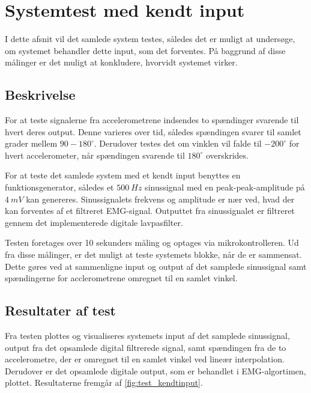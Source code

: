 \section{Systemtest med kendt input}
I dette afsnit vil det samlede system testes, således det er muligt at undersøge, om systemet behandler dette input, som det forventes. På baggrund af disse målinger er det muligt at konkludere, hvorvidt systemet virker. 

\subsection{Beskrivelse}
For at teste signalerne fra accelerometrene indsendes to spændinger svarende til hvert deres output. Denne varieres over tid, således spændingen svarer til samlet grader mellem $90-180^{\circ}$. Derudover testes det om vinklen vil falde til $-200^{\circ}$ for hvert accelerometer, når spændingen svarende til $180^{\circ}$ overskrides. 

For at teste det samlede system med et kendt input benyttes en funktionsgenerator, således et $500~Hz$ sinussignal med en peak-peak-amplitude på $4~mV$ kan genereres. Sinussignalets frekvens og amplitude er nær ved, hvad der kan forventes af et filtreret EMG-signal. Outputtet fra sinussignalet er filtreret gennem det implementerede digitale lavpasfilter. 

Testen foretages over 10 sekunders måling og optages via mikrokontrolleren. Ud fra disse målinger, er det muligt at teste systemets blokke, når de er sammensat. Dette gøres ved at sammenligne input og output af det samplede sinussignal samt spændingerne for acclerometrene omregnet til en samlet vinkel.


\subsection{Resultater af test}
Fra testen plottes og visualiseres systemets input af det samplede sinussignal, output fra det opsamlede digital filtrerede signal, samt spændingen fra de to accelerometre, der er omregnet til en samlet vinkel ved lineær interpolation. Derudover er det opsamlede digitale output, som er behandlet i EMG-algortimen, plottet. Resultaterne fremgår af \autoref{fig:test_kendtinput}. 

